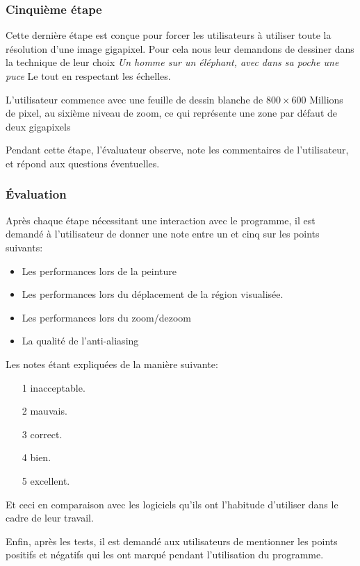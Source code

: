 			\subsubsection{Cinquième étape}
			Cette dernière étape est conçue pour forcer les utilisateurs à utiliser toute la résolution d'une image
			gigapixel. Pour cela nous leur demandons de dessiner dans la technique de leur choix \emph{Un homme sur
			un éléphant, avec dans sa poche une puce} Le tout en respectant les échelles. 

			L'utilisateur commence avec une feuille de dessin blanche de $800 \times 600$ Millions de pixel, au sixième
			niveau de zoom, ce qui représente une zone par défaut de deux gigapixels

			Pendant cette étape, l'évaluateur observe, note les commentaires de l'utilisateur, et répond aux questions
			éventuelles. 

			\subsubsection{Évaluation}
			Après chaque étape nécessitant une interaction avec le programme, il est demandé à l'utilisateur de donner
			une note entre un et cinq sur les points suivants:
			\begin{itemize}
				\item Les performances lors de la peinture
				\item Les performances lors du déplacement de la région visualisée.
				\item Les performances lors du zoom/dezoom
				\item La qualité de l'anti-aliasing
			\end{itemize}
			Les notes étant expliquées de la manière suivante:
			\begin{enumerate}
				\item[1] inacceptable.
				\item[2] mauvais.
				\item[3] correct.
				\item[4] bien.
				\item[5] excellent.
			\end{enumerate}
			Et ceci en comparaison avec les logiciels qu'ils ont l'habitude d'utiliser dans le cadre de leur travail. 

			Enfin, après les tests, il est demandé aux utilisateurs de mentionner les points positifs et négatifs qui les
			ont marqué pendant l'utilisation du programme. 
